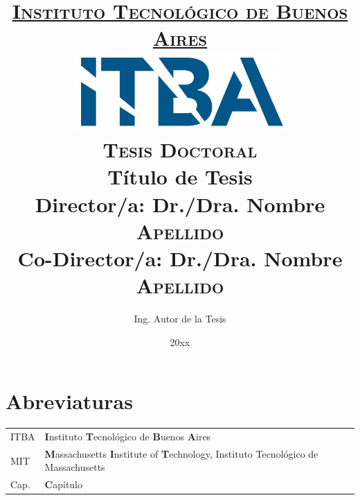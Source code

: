\documentclass[10pt]{book}
\title{
	{\href{http://www.itba.edu.ar}{\textsc{Instituto Tecnológico de Buenos Aires}}}\\
	\vspace*{1\baselineskip}
	{\includegraphics[height=30mm]{figs/logo_itba.png}}\\
	{\large \textsc{Tesis Doctoral}}\\
	\vspace*{1\baselineskip}
	{Título de Tesis}\\
	\vspace*{1\baselineskip}
	{Director/a: Dr./Dra. Nombre \textsc{Apellido}\\Co-Director/a: Dr./Dra. Nombre \textsc{Apellido}}
}
\author{Ing. Autor de la Tesis}
\date{20xx}
\begin{document}
\maketitle
\tableofcontents 
\listoffigures			%
\listoftables			%

\chapter*{Abreviaturas}
\begin{table}[htb]
	\large
	\begin{tabular}{l l}
		ITBA & \textbf{I}nstituto \textbf{T}ecnológico de \textbf{B}uenos \textbf{A}ires \\
		MIT & \textbf{M}assachusetts \textbf{I}nstitute of \textbf{T}echnology, Instituto Tecnológico de Massachusetts \\
		Cap. & \textbf{C}apítulo
	\end{tabular}
\end{table}

\mainmatter
{}

%
%

\appendix %

%



\end{document}
